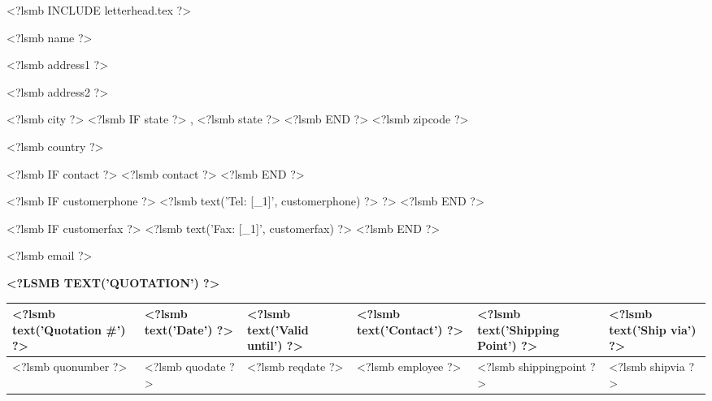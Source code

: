 \documentclass{scrartcl}
\begin{document}
\pagestyle{myheadings}
\thispagestyle{empty}

\newsavebox{\ftr}

<?lsmb INCLUDE letterhead.tex ?>



\vspace*{0.5cm}

\parbox[t]{.5\textwidth}{

<?lsmb name ?>

<?lsmb address1 ?>

<?lsmb address2 ?>

<?lsmb city ?>
<?lsmb IF state ?>
\hspace{-0.1cm}, <?lsmb state ?>
<?lsmb END ?>
<?lsmb zipcode ?>

<?lsmb country ?>

\vspace{0.3cm}

<?lsmb IF contact ?>
<?lsmb contact ?>
\vspace{0.2cm}
<?lsmb END ?>

<?lsmb IF customerphone ?>
<?lsmb text('Tel: [_1]', customerphone) ?> ?>
<?lsmb END ?>

<?lsmb IF customerfax ?>
<?lsmb text('Fax: [_1]', customerfax) ?>
<?lsmb END ?>

<?lsmb email ?>
}

\vspace{1cm}

\textbf{\MakeUppercase{<?lsmb text('Quotation') ?>}}
\hfill

\vspace{1cm}

\begin{tabularx}{\textwidth}{*{6}{|X}|} \hline
  \textbf{<?lsmb text('Quotation #') ?>} & \textbf{<?lsmb text('Date') ?>} 
  & \textbf{<?lsmb text('Valid until') ?>} & \textbf{<?lsmb text('Contact') ?>} 
  & \textbf{<?lsmb text('Shipping Point') ?>} 
  & \textbf{<?lsmb text('Ship via') ?>} \\ [0.5ex]
  \hline
  <?lsmb quonumber ?> & <?lsmb quodate ?> & <?lsmb reqdate ?> & <?lsmb employee ?> & <?lsmb shippingpoint ?> & <?lsmb shipvia ?> \\
  \hline
\end{tabularx}
  
\end{document}
